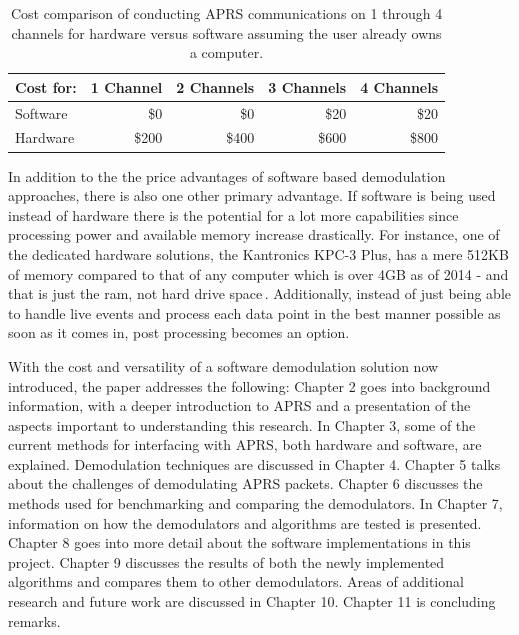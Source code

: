 \begin{table}
	\begin{center}
		\begin{tabular}{ | l | r | r | r | r | }
		\hline
			Cost for: & 1 Channel & 2 Channels & 3 Channels & 4 Channels \\ \hline
			Software & \$0 & \$0 & \$20 & \$20 \\ \hline
			Hardware & \$200 & \$400 & \$600 & \$800 \\
			\hline
		\end{tabular}
		\caption[Hardware and Software Cost Comparison]{Cost comparison of conducting APRS communications on 1 through 4 channels for hardware versus software assuming the user already owns a computer.}
		\label{costCompareTable}
	\end{center}
\end{table}

In addition to the the price advantages of software based demodulation approaches, there is also one other primary advantage. If software is being used instead of hardware there is the potential for a lot more capabilities since processing power and available memory increase drastically. For instance, one of the dedicated hardware solutions, the Kantronics KPC-3 Plus, has a mere 512KB of memory compared to that of any computer which is over 4GB as of 2014 - and that is just the ram, not hard drive space\,\cite{Kantronics2014,Graham-Smith2014}. Additionally, instead of just being able to handle live events and process each data point in the best manner possible as soon as it comes in, post processing becomes an option.

With the cost and versatility of a software demodulation solution now introduced, the paper addresses the following: Chapter 2 goes into background information, with a deeper introduction to APRS and a presentation of the aspects important to understanding this research. In Chapter 3, some of the current methods for interfacing with APRS, both hardware and software, are explained. Demodulation techniques are discussed in Chapter 4. Chapter 5 talks about the challenges of demodulating APRS packets. Chapter 6 discusses the methods used for benchmarking and comparing the demodulators. In Chapter 7, information on how the demodulators and algorithms are tested is presented. Chapter 8 goes into more detail about the software implementations in this project. Chapter 9 discusses the results of both the newly implemented algorithms and compares them to other demodulators. Areas of additional research and future work are discussed in Chapter 10. Chapter 11 is concluding remarks.
